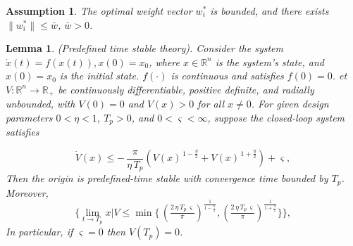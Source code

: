 \documentclass[pdflatex,sn-mathphys-num]{sn-jnl}%
\theoremstyle{thmstyleone}%
\newtheorem{lemma}{Lemma}
\newtheorem{assumption}{Assumption}
\theoremstyle{thmstyletwo}%
\theoremstyle{thmstylethree}%
\begin{document}
\begin{assumption}\label{assumption:3}
	The optimal weight vector $w_i^*$ is bounded, and there exists \(\| w_i^* \| \leq \bar{w}\), $\bar{w} > 0$.
\end{assumption}



\begin{lemma} \label{lemma:1}\cite{WangEtAl_2022_Adaptivefuzzy} (Predefined time stable theory). Consider the system $
		\dot{x}(t) = f(x(t)), x(0) = x_0
$, where $x \in \mathbb{R}^n$ is the system's state, and $x(0) = x_0$ is the initial state. $f(\cdot)$ is continuous and satisfies $f(0) = 0$. et $V:\mathbb{R}^n\to\mathbb{R}_+$ be continuously differentiable, positive definite, and radially unbounded, with $V(0)=0$ and $V(x)>0$ for all $x\neq 0$.
For given design parameters $0<\eta<1$, $T_p>0$, and $0<\varsigma<\infty$, suppose the closed-loop system satisfies
                  
	\begin{equation}	\label{eq:7}
		\dot V(x) \le
		-\,\frac{\pi}{\eta\,T_p}\left(V(x)^{\,1-\frac{\eta}{2}}+V(x)^{\,1+\frac{\eta}{2}}\right)
		+\varsigma,
	\end{equation}
	Then the origin is predefined-time stable with convergence time bounded by $T_p$. Moreover,
	\begin{equation}\label{eq:8}
		\Biggl\{ \lim_{t\to T_p} x|V
		\le
		\min\!\Biggl\{\,
		\left(\tfrac{2\,\eta\,T_p\,\varsigma}{\pi}\right)^{\frac{1}{1-\frac{\eta}{2}}}\!,
		\left(\tfrac{2\,\eta\,T_p\,\varsigma}{\pi}\right)^{\frac{1}{1+\frac{\eta}{2}}}
		\Biggr\} \Biggr\},
	\end{equation}
	In particular, if $\varsigma=0$ then $V(T_p)=0$.
\end{lemma}
\end{document}
